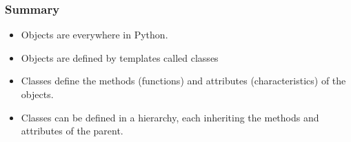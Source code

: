 \documentclass{beamer}
\begin{document}
\begin{frame}[fragile]
\frametitle{Summary}
\begin{itemize}
\item Objects are everywhere in Python.
\item Objects are defined by templates called classes
\item Classes define the methods (functions) and attributes (characteristics) of the objects.
\item Classes can be defined in a hierarchy, each inheriting the methods and attributes of the parent.
\end{itemize}


\end{frame}
\end{document}
